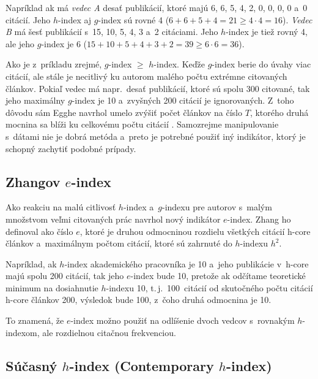 Napríklad ak má \emph{vedec A} desať publikácií, ktoré majú 6, 6, 5, 4, 2, 0, 0,
0, 0 a~0 citácií.  Jeho $h$-index aj $g$-index sú rovné 4
($6+6+5+4 = 21 \geq 4\cdot4=16$). \emph{Vedec B} má šesť publikácií s~15, 10, 5,
4, 3 a~2 citáciami.  Jeho $h$-index je tiež rovný 4, ale jeho $g$-index je 6
($15+10+5+4+3+2 = 39 \geq 6\cdot6 = 36$).

Ako je z~príkladu zrejmé, $g$-index $\geq$ $h$-index.  Keďže $g$-index berie do
úvahy viac citácií, ale stále je necitlivý ku autorom malého počtu extrémne
citovaných článkov.  Pokiaľ vedec má napr.~desať publikácií, ktoré sú spolu 300
citované, tak jeho maximálny $g$-index je 10 a~zvyšných 200 citácií je
ignorovaných.  Z~toho dôvodu sám Egghe navrhol umelo zvýšiť počet článkov na
číslo $T$, ktorého druhá mocnina sa blíži ku celkovému počtu citácií
\citep{Egghe2006}.  Samozrejme manipulovanie s~dátami nie je dobrá metóda
a~preto je potrebné použiť iný indikátor, ktorý je schopný zachytiť podobné
prípady.


\subsection{Zhangov $e$-index}
\label{sec:e-index}

Ako reakciu na malú citlivosť $h$-index a~$g$-indexu pre autorov s~malým
množstvom veľmi citovaných prác \citet{Zhang2009} navrhol nový indikátor
$e$-index.  Zhang ho definoval ako číslo $e$, ktoré je druhou odmocninou
rozdielu všetkých citácií h-core článkov a~maximálnym počtom citácií, ktoré sú
zahrnuté do $h$-indexu $h^2$.

Napríklad, ak $h$-index akademického pracovníka je 10 a~jeho publikácie v~h-core
majú spolu 200 citácií, tak jeho $e$-index bude 10, pretože ak odčítame
teoretické minimum na dosiahnutie $h$-indexu 10, t.\,j.~100~citácií od
skutočného počtu citácií h-core článkov 200, výsledok bude 100, z~čoho druhá
odmocnina je 10.

To znamená, že $e$-index možno použiť na odlíšenie dvoch vedcov s~rovnakým
$h$-indexom, ale rozdielnou citačnou frekvenciou.


\subsection{Súčasný $h$-index (Contemporary $h$-index)}
\label{sec:hc-index}

